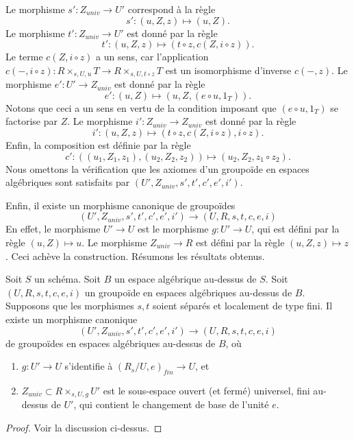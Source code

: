 \medskip\noindent
Le morphisme $s' : Z_{univ} \to U'$ correspond à la règle
$$
s' : (u, Z, z) \mapsto (u, Z).
$$
Le morphisme $t' : Z_{univ} \to U'$ est donné par la règle
$$
t' : (u, Z, z) \mapsto (t \circ z, c(Z, i \circ z)).
$$
Le terme $c(Z, i \circ z)$
a un sens, car l'application
$c(-, i \circ z) : R \times_{s, U, u} T \to R \times_{s, U, t \circ z} T$
est un isomorphisme d'inverse $c(-, z)$.
Le morphisme $e' : U' \to Z_{univ}$ est donné par la règle
$$
e' : (u, Z) \mapsto (u, Z, (e \circ u, 1_T)).
$$
Notons que ceci a un sens en vertu de la condition imposant que
$(e \circ u, 1_T)$ se factorise par $Z$.
Le morphisme $i' : Z_{univ} \to Z_{univ}$ est donné par la règle
$$
i' : (u, Z, z) \mapsto (t \circ z, c(Z, i \circ z), i \circ z).
$$
Enfin, la composition est définie par la règle
$$
c' : ((u_1, Z_1, z_1), (u_2, Z_2, z_2)) \mapsto (u_2, Z_2, z_1 \circ z_2).
$$
Nous omettons la vérification que les axiomes d'un groupoïde en espaces
algébriques sont satisfaits par $(U', Z_{univ}, s', t', c', e', i')$.

\medskip\noindent
Enfin, il existe un morphisme canonique de groupoïdes
$$
(U', Z_{univ}, s', t', c', e', i')
\longrightarrow
(U, R, s, t, c, e, i)
$$
En effet, le morphisme $U' \to U$ est le morphisme $g : U' \to U$,
qui est défini par la règle $(u, Z) \mapsto u$. Le morphisme
$Z_{univ} \to R$ est défini par la règle $(u, Z, z) \mapsto z$.
Ceci achève la construction. Résumons les résultats obtenus.

\begin{lemma}
\label{lemma-finite-part-groupoid}
Soit $S$ un schéma.
Soit $B$ un espace algébrique au-dessus de $S$.
Soit $(U, R, s, t, c, e, i)$ un groupoïde en espaces algébriques au-dessus de $B$.
Supposons que les morphismes $s, t$ soient séparés et localement de type fini.
Il existe un morphisme canonique
$$
(U', Z_{univ}, s', t', c', e', i')
\longrightarrow
(U, R, s, t, c, e, i)
$$
de groupoïdes en espaces algébriques au-dessus de $B$, où
\begin{enumerate}
\item $g : U' \to U$ s'identifie à $(R_s/U, e)_{fin} \to U$, et
\item $Z_{univ} \subset R \times_{s, U, g} U'$ est le sous-espace
ouvert (et fermé) universel, fini au-dessus de $U'$, qui contient le
changement de base de l'unité $e$.
\end{enumerate}
\end{lemma}

\begin{proof}
Voir la discussion ci-dessus.
\end{proof}









